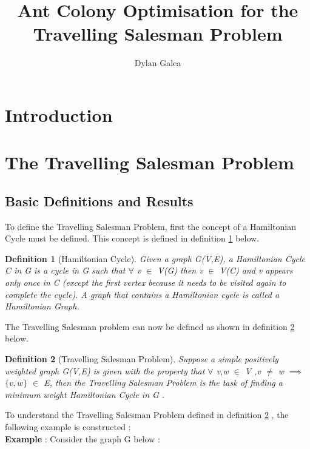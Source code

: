 \documentclass{article}
\title{Ant Colony Optimisation for the Travelling Salesman Problem}
\author{Dylan Galea}
\newtheorem{definition}{Definition}[subsection]
\begin{document}
\maketitle
\newpage
\tableofcontents
\newpage
\section{Introduction}
\newpage
\section{The Travelling Salesman Problem}
\subsection{Basic Definitions and Results}
To define the Travelling Salesman Problem, first the concept of a Hamiltonian Cycle must be defined. This concept is defined in definition \ref{Hamiltonian Cycle} below.
\begin{definition}[Hamiltonian Cycle]
\label{Hamiltonian Cycle}
Given a graph G(V,E), a Hamiltonian Cycle C in G is a cycle in G such that $\forall$ v $\in$ V(G) then v $\in$ V(C) and v appears only once in C (except the first vertex because it needs to be visited again to complete the cycle). A graph that contains a Hamiltonian cycle is called a Hamiltonian Graph. \cite{weisstein_2018}
\end{definition}
The Travelling Salesman problem can now be defined as shown in definition \ref{Travelling Salesman Problem} below.
\begin{definition}[Travelling Salesman Problem]
\label{Travelling Salesman Problem}
Suppose a simple positively weighted graph G(V,E) is given with the property that $\forall$ v,w $\in$ V ,v $\ne$ w $\implies$ $\{v,w\}$ $\in$ E, then the Travelling Salesman Problem is the task of finding a minimum weight Hamiltonian Cycle in G \cite{geeksforgeeks_2018}.
\end{definition}
To understand the Travelling Salesman Problem defined in definition \ref{Travelling Salesman Problem} , the following example is constructed :\\
\textbf{Example} : Consider the graph G below :


\end{document}
